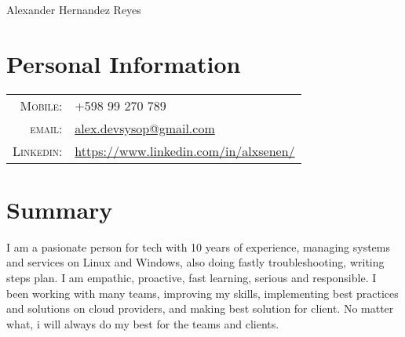 \documentclass[a4paper,12pt]{article}
\begin{document}
\vspace*{-0.5cm}

\pagestyle{empty} %

{\huge Alexander Hernandez Reyes}
\hfill
{}\\
\section{Personal Information}
\begin{tabular}{rl}
    \textsc{Mobile:}    & +598 99 270 789 \\
    \textsc{email:}     & \href{mailto:alex.devsysop@gmail.com}{alex.devsysop@gmail.com} \\
    \textsc{Linkedin:}  & \href{https://www.linkedin.com/in/alxsenen/}{https://www.linkedin.com/in/alxsenen/} \\
\end{tabular}

\section{Summary}
\justify
I am a pasionate person for tech with 10 years of experience, managing systems and services on Linux and Windows, also doing fastly troubleshooting, writing steps plan. I am empathic, proactive, fast learning, serious and responsible.
I been working with many teams, improving my skills, implementing best practices and solutions on cloud providers, and making best solution for client. No matter what, i will always do my best for the teams and clients.

\end{document}
